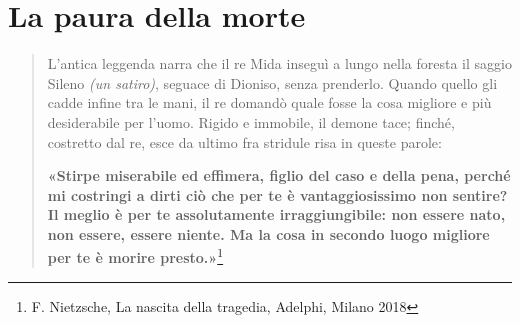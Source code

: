 \chapter{La paura della morte}

\begin{quotation}
	\small L’antica leggenda narra che il re Mida inseguì a lungo nella foresta il saggio Sileno \textit{(un satiro)}, seguace di Dioniso, senza prenderlo.
	Quando quello gli cadde infine tra le mani, il re domandò quale fosse la cosa migliore e più desiderabile per l’uomo.
	Rigido e immobile, il demone tace; finché, costretto dal re, esce da ultimo fra stridule risa in queste parole:
	
\textbf{	«Stirpe miserabile ed effimera, figlio del caso e della pena, perché mi costringi a dirti ciò che per te è vantaggiosissimo non sentire?
	Il meglio è per te assolutamente irraggiungibile: non essere nato, non essere, essere niente.
	Ma la cosa in secondo luogo migliore per te è morire presto.»}\footnote{ F. Nietzsche, La nascita della tragedia, Adelphi, Milano 2018}
\end{quotation}

